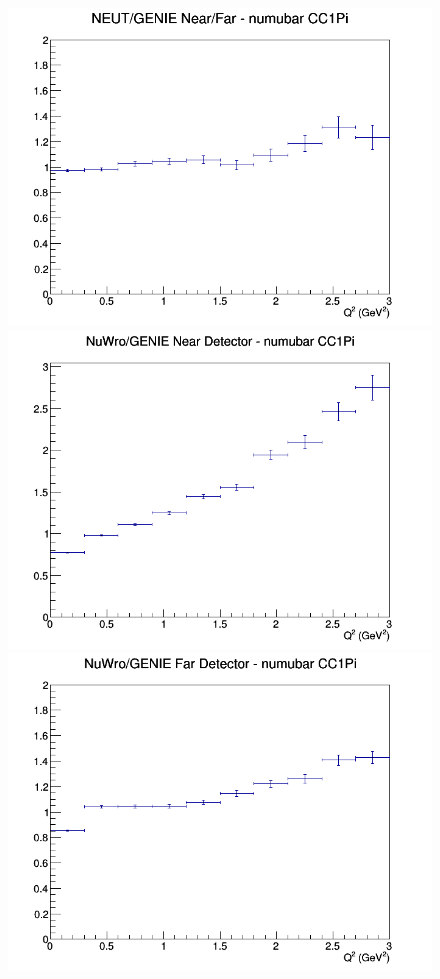 \begin{figure}[h]
\endminipage
{}
\includegraphics[width=\linewidth]{eff_Q2/LAr/ratios/CC1Pi_NEUT_GENIE_numubar_NF_Q2.png}
\endminipage
\newline
{}
\includegraphics[width=\linewidth]{eff_Q2/LAr/ratios/CC1Pi_NuWro_GENIE_numubar_near_Q2.png}
\endminipage
{}
\includegraphics[width=\linewidth]{eff_Q2/LAr/ratios/CC1Pi_NuWro_GENIE_numubar_far_Q2.png}

\end{figure}
